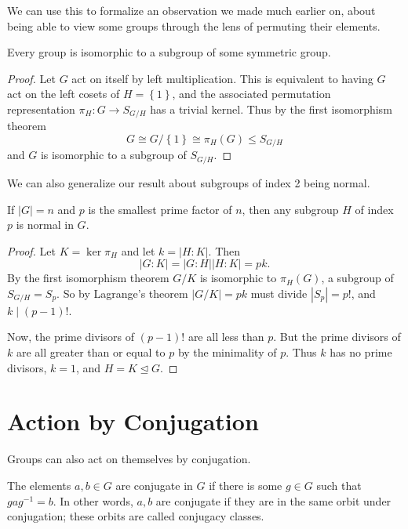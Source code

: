 \documentclass[../m171main.tex]{subfiles}
\begin{document}
We can use this to formalize an observation we made much earlier on, about being able to view some groups through the lens of permuting their elements.

\begin{corollary}
    Every group is isomorphic to a subgroup of some symmetric group.
\end{corollary}

\begin{proof}
    Let $G$ act on itself by left multiplication.
    This is equivalent to having $G$ act on the left cosets of $H = \left\{ 1 \right\}$, and the associated permutation representation $\pi_H : G \to S_{G / H}$ has a trivial kernel.
    Thus by the first isomorphism theorem
    \[ G \cong G / \left\{ 1 \right\} \cong \pi_H(G) \leq S_{G / H} \]
    and $G$ is isomorphic to a subgroup of $S_{G / H}$.
\end{proof}

We can also generalize our result about subgroups of index 2 being normal.

\begin{corollary}[]
    If $|G| = n$ and $p$ is the smallest prime factor of $n$, then any subgroup $H$ of index $p$ is normal in $G$.
\end{corollary}

\begin{proof}
    Let $K = \ker \pi_H$ and let $k = |H : K|$.
    Then
    \[ |G : K| = |G : H| |H : K| = pk. \]
    By the first isomorphism theorem $G / K$ is isomorphic to $\pi_H(G)$, a subgroup of $S_{G / H} = S_p$.
    So by Lagrange's theorem $|G / K| = pk$ must divide $|S_p| = p!$, and $k \mid (p-1)!$.

    Now, the prime divisors of $(p-1)!$ are all less than $p$.
    But the prime divisors of $k$ are all greater than or equal to $p$ by the minimality of $p$.
    Thus $k$ has no prime divisors, $k = 1$, and $H = K \trianglelefteq G$.
\end{proof}

\section{Action by Conjugation}
Groups can also act on themselves by conjugation.

\begin{definition}
    The elements $a,b \in G$ are conjugate in $G$ if there is some $g \in G$ such that $gag^{-1} = b$.
    In other words, $a,b$ are conjugate if they are in the same orbit under conjugation; these orbits are called conjugacy classes.
\end{definition}
\end{document}
